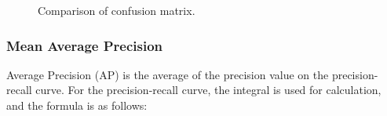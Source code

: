 \documentclass[journal,article,submit,moreauthors,pdftex]{Definitions/mdpi}
\begin{document}
\begin{figure}[htbp]
\centering
{}
\quad
{}
\caption{Comparison of confusion matrix.}
\label{fig:confusion matrix}
\end{figure}



\subsubsection{Mean Average Precision}
Average Precision (AP) is the average of the precision value on the precision-recall curve. For the precision-recall curve, the integral is used for calculation, and the formula is as follows:
\end{document}
